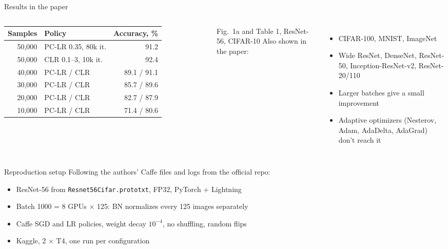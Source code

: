 \documentclass[aspectratio=169,11pt]{beamer}
\begin{document}
\begin{frame}{Results in the paper}
  \begin{columns}[T]
    \small
    \begin{tabular}{rlr}
      \toprule
      Samples & Policy & Accuracy, \% \\
      \midrule
      50,000 & PC-LR 0.35, 80k it. & 91.2 \\
      50,000 & CLR 0.1--3, 10k it. & 92.4 \\
      40,000 & PC-LR / CLR & 89.1 / 91.1 \\
      30,000 & PC-LR / CLR & 85.7 / 89.6 \\
      20,000 & PC-LR / CLR & 82.7 / 87.9 \\
      10,000 & PC-LR / CLR & 71.4 / 80.6 \\
      \bottomrule
    \end{tabular}

    \footnotesize Fig.\ 1a and Table 1, ResNet-56, CIFAR-10
    Also shown in the paper:
    \begin{itemize}
      \item CIFAR-100, MNIST, ImageNet
      \item Wide ResNet, DenseNet, ResNet-50, Inception-ResNet-v2, ResNet-20/110
      \item Larger batches give a small improvement
      \item Adaptive optimizers (Nesterov, Adam, AdaDelta, AdaGrad) don't reach it
    \end{itemize}
  \end{columns}
\end{frame}

\begin{frame}{Reproduction setup}
  Following the authors' Caffe files and logs from the official repo:
  \begin{itemize}
    \item ResNet-56 from \texttt{Resnet56Cifar.prototxt}, FP32, PyTorch + Lightning
    \item Batch 1000 = 8 GPUs $\times$ 125: BN normalizes every 125 images separately
    \item Caffe SGD and LR policies, weight decay $10^{-4}$, no shuffling, random flips
    \item Kaggle, 2 $\times$ T4, one run per configuration
  \end{itemize}
\end{frame}
\end{document}
